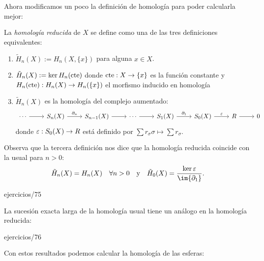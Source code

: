 \documentclass[../../topologia_algebraica]{subfiles}
\begin{document}
Ahora modificamos un poco la definici\'on de homolog\'ia para poder calcularla
mejor:

\begin{defin}
  La \emph{homolog\'ia reducida} de $X$ se define como una de las tres definiciones
  equivalentes:
  \begin{enumerate}
  \item $\tilde{H}_n(X):=H_n(X,\{x\})$ para alguna $x\in X$.
  \item $\tilde{H}_n(X):=\ker H_n(\text{cte})$ donde $\text{cte}:X\rightarrow\{x\}$ es la funci\'on constante y
    $H_n(\text{cte}):H_n(X)\rightarrow H_n(\{x\})$ el morfismo inducido en homolog\'ia
  \item $\tilde{H}_n(X)$ es la homolog\'ia del complejo aumentado:
    \[
      \begin{tikzcd}
        \cdots \arrow[r] & S_n(X) \arrow[r,"\partial_n"] & S_{n-1}(X) \arrow[r] & \cdots \arrow[r] &
        S_1(X) \arrow[r,"\partial_1"] & S_0(X) \arrow[r,"\eps"] & R \arrow[r] & 0
      \end{tikzcd}
    \]
    donde $\varepsilon:S_0(X)\rightarrow R$ est\'a definido por $\sum r_{\sigma}\sigma\mapsto \sum r_{\sigma}$.
  \end{enumerate}
\end{defin}

\begin{nota}
  Observa que la tercera definici\'on nos dice que la homolog\'ia reducida coincide
  con la usual para $n>0$:
  \[
    \tilde{H}_n(X)=H_n(X)\quad\forall n>0 \quad\text{y}\quad
    \tilde{H}_0(X)=\frac{\ker\eps}{\im{\partial_1}}.
  \]
\end{nota}

{ejercicios/75}%

La sucesi\'on exacta larga de la homolog\'ia usual tiene un an\'alogo en la homolog\'ia
reducida:

{ejercicios/76}%

Con estos resultados podemos calcular la homolog\'ia de las esferas:
\end{document}
